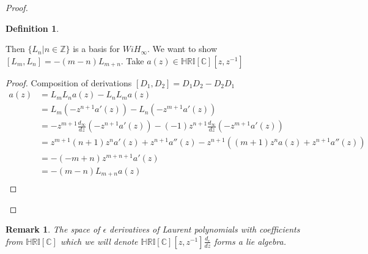 \documentclass[10pt, oneside]{article}
\newcommand{\C}{\mathbb{C}}
\newcommand{\Z}{\mathbb{Z}}
\newcommand{\HRI}{\mathbb{HRI}}
\newtheorem{defn}{Definition}
\newtheorem{rem}{Remark}
\begin{document}
\begin{proof}
\begin{defn}
    \end{defn}
    Then $\{L_{n} | n \in \Z \}$ is a basis for $WiH_{\infty}$. We want to show $[L_{m},L_{n}]= -(m-n) L_{m+n}$. Take $a(z) \in \HRI[\C][z,z^{-1}]$
    \begin{proof}
        Composition of derivations $[D_1, D_2]=D_1 D_2 - D_2 D_1$ \cite{Kac1990}
        \begin{align*}
            [L_m, L_n] a(z) &= L_m L_n a(z) - L_n L_m a(z) \\
            &= L_m (-z^{n+1}a'(z)) - L_n ( -z^{m+1} a'(z))\\
            &= -z^{m+1} \frac{d_\infty}{dz} (-z^{n+1} a'(z)) - (-1) z^{n+1} \frac{d_{\infty}}{dz} (-z^{m+1} a'(z)) \\
            &= z^{m+1} (n+1) z^n a'(z) + z^{n+1} a''(z) - z^{n+1} ((m+1)z^n a(z)+z^{n+1} a''(z)) \\
            &= -(-m + n) z^{m+n+1} a'(z) \\
            &= -(m-n)L_{m+n} a(z) \\
        \end{align*}
    \end{proof} 
\end{proof}
\begin{rem}
    The space of $\epsilon$ derivatives of Laurent polynomials with coefficients from $\HRI[\C]$ which we will denote 
    $\HRI[\C][z,z^{-1}]\frac{d_{\epsilon}}{dz}$ forms a lie algebra. 
\end{rem}
\end{document}
